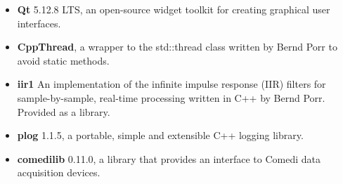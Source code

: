 \begin{itemize}
\item \textbf{Qt} 5.12.8 LTS, an open-source widget toolkit for creating graphical user interfaces. \citep{Qt2018}
\item \textbf{CppThread}, a wrapper to the std::thread class written by Bernd Porr to avoid static methods. \citep{Porr2020Thread}
\item \textbf{iir1} An implementation of the infinite impulse response (IIR) filters for sample-by-sample, real-time processing written in C++ by Bernd Porr. Provided as a library. \citep{Porr2020iir} 
\item \textbf{plog} 1.1.5, a portable, simple and extensible C++ logging library. \citep{Podobry2019}
\item \textbf{comedilib} 0.11.0, a library that provides an interface to Comedi data acquisition devices. \\ \citep{Comedi2017}
\end{itemize}

